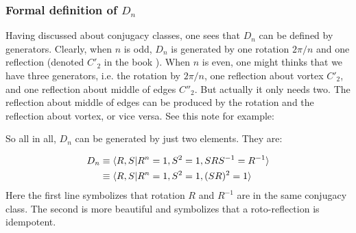 \subsubsection{Formal definition of \texorpdfstring{$D_n$}{}}

Having discussed about conjugacy classes, one sees that $D_n$ can be
defined by generators.  Clearly, when $n$ is odd, $D_n$ is generated
by one rotation $2\pi/n$ and one reflection (denoted $C'_2$ in the
book \cite{book}). When $n$ is even, one might thinks that we have
three generators, i.e. the rotation by $2\pi/n$, one reflection about
vortex $C'_2$, and one reflection about middle of edges $C''_2$. But
actually it only needs two. The reflection about middle of edges can
be produced by the rotation and the reflection about vortex, or vice
versa. See this note for example:


So all in all, $D_n$ can be generated by just two elements. They are:
\begin{fact}
\label{fact:point-group-formal-def-dn}
\begin{align}
    D_n &\equiv \braket{R,S|R^n=1,S^2=1,SRS^{-1}=R^{-1}} \\
        &\equiv \braket{R,S|R^n=1,S^2=1,(SR)^2=1}
\end{align}
Here the first line symbolizes that rotation $R$ and $R^{-1}$ are in
the same conjugacy class. The second is more beautiful and symbolizes
that a roto-reflection is idempotent.
\end{fact}

